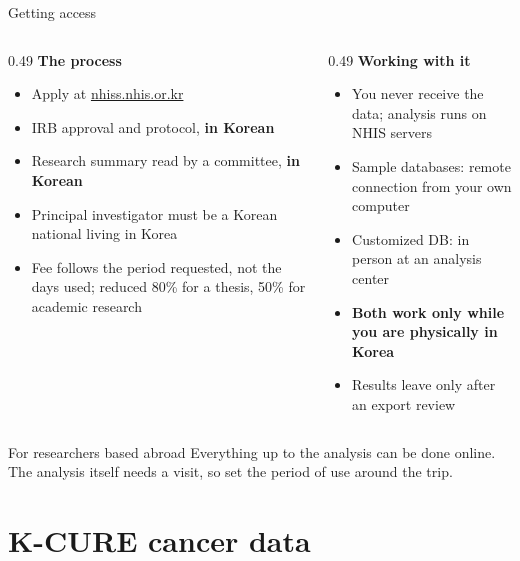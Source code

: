 \documentclass[aspectratio=169,11pt]{beamer}
\newcommand{\hl}[1]{\textbf{\color{kdgreen}#1}}
\begin{document}
\begin{frame}{Getting access}
  \begin{columns}[T]
    \begin{column}{0.49\textwidth}
      \textbf{\color{kdgreen}The process}
      \begin{itemize}\small
        \setlength{\itemsep}{5pt}
        \item Apply at \href{https://nhiss.nhis.or.kr}{nhiss.nhis.or.kr}
        \item IRB approval and protocol, \hl{in Korean}
        \item Research summary read by a committee, \hl{in Korean}
        \item Principal investigator must be a Korean national living in Korea
        \item Fee follows the period requested, not the days used; reduced 80\% for
              a thesis, 50\% for academic research
      \end{itemize}
    \end{column}
    \begin{column}{0.49\textwidth}
      \textbf{\color{kdaccent}Working with it}
      \begin{itemize}\small
        \setlength{\itemsep}{5pt}
        \item You never receive the data; analysis runs on NHIS servers
        \item Sample databases: remote connection from your own computer
        \item Customized DB: in person at an analysis center
        \item \hl{Both work only while you are physically in Korea}
        \item Results leave only after an export review
      \end{itemize}
    \end{column}
  \end{columns}
  \vspace{4pt}
  \begin{block}{For researchers based abroad}
    Everything up to the analysis can be done online. The analysis itself needs a
    visit, so set the period of use around the trip.
  \end{block}
\end{frame}

\section{K-CURE cancer data}
\end{document}
